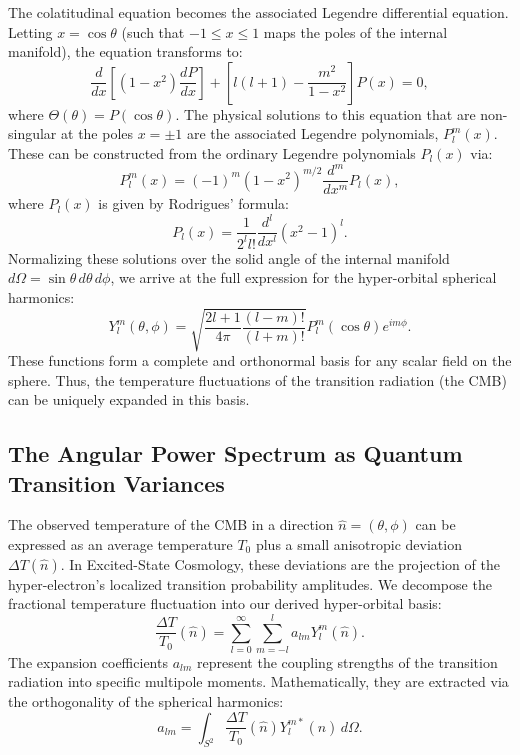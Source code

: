 The colatitudinal equation becomes the associated Legendre differential equation. Letting $x = \cos\theta$ (such that $-1 \le x \le 1$ maps the poles of the internal manifold), the equation transforms to:
\begin{equation}
\frac{d}{dx} \left[ (1-x^2) \frac{dP}{dx} \right] + \left[ l(l+1) - \frac{m^2}{1-x^2} \right] P(x) = 0,
\end{equation}
where $\Theta(\theta) = P(\cos\theta)$. The physical solutions to this equation that are non-singular at the poles $x = \pm 1$ are the associated Legendre polynomials, $P_l^m(x)$. These can be constructed from the ordinary Legendre polynomials $P_l(x)$ via:
\begin{equation}
P_l^m(x) = (-1)^m (1-x^2)^{m/2} \frac{d^m}{dx^m} P_l(x),
\end{equation}
where $P_l(x)$ is given by Rodrigues' formula:
\begin{equation}
P_l(x) = \frac{1}{2^l l!} \frac{d^l}{dx^l} (x^2 - 1)^l.
\end{equation}
Normalizing these solutions over the solid angle of the internal manifold $d\Omega = \sin\theta \, d\theta \, d\phi$, we arrive at the full expression for the hyper-orbital spherical harmonics:
\begin{equation}
Y_l^m(\theta, \phi) = \sqrt{\frac{2l+1}{4\pi} \frac{(l-m)!}{(l+m)!}} P_l^m(\cos\theta) e^{im\phi}.
\end{equation}
These functions form a complete and orthonormal basis for any scalar field on the sphere. Thus, the temperature fluctuations of the transition radiation (the CMB) can be uniquely expanded in this basis.

\subsection{The Angular Power Spectrum as Quantum Transition Variances}

The observed temperature of the CMB in a direction $\hat{n} = (\theta, \phi)$ can be expressed as an average temperature $T_0$ plus a small anisotropic deviation $\Delta T(\hat{n})$. In Excited-State Cosmology, these deviations are the projection of the hyper-electron's localized transition probability amplitudes. We decompose the fractional temperature fluctuation into our derived hyper-orbital basis:
\begin{equation}
\frac{\Delta T}{T_0}(\hat{n}) = \sum_{l=0}^{\infty} \sum_{m=-l}^{l} a_{lm} Y_l^m(\hat{n}).
\end{equation}
The expansion coefficients $a_{lm}$ represent the coupling strengths of the transition radiation into specific multipole moments. Mathematically, they are extracted via the orthogonality of the spherical harmonics:
\begin{equation}
a_{lm} = \int_{S^2} \frac{\Delta T}{T_0}(\hat{n}) Y_l^{m*}(\hat{n}) \, d\Omega.
\end{equation}

